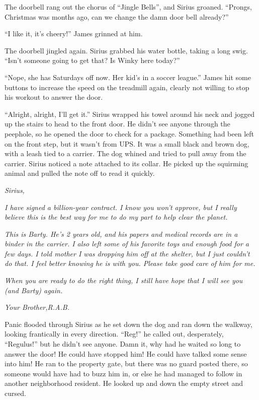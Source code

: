 \documentclass[12pt,twoside,openright]{memoir}
\begin{document}
The doorbell rang out the chorus of ``Jingle Bells'', and Sirius groaned. ``Prongs, Christmas was months ago, can we change the damn door bell already?''

``I like it, it's cheery!'' James grinned at him. 

The doorbell jingled again. Sirius grabbed his water bottle, taking a long swig. ``Isn't someone going to get that? Is Winky here today?''

``Nope, she has Saturdays off now. Her kid's in a soccer league.'' James hit some buttons to increase the speed on the treadmill again, clearly not willing to stop his workout to answer the door.

``Alright, alright, I'll get it.'' Sirius wrapped his towel around his neck and jogged up the stairs to head to the front door. He didn't see anyone through the peephole, so he opened the door to check for a package. Something had been left on the front step, but it wasn't from UPS. It was a small black and brown dog, with a leash tied to a carrier. The dog whined and tried to pull away from the carrier. Sirius noticed a note attached to its collar. He picked up the squirming animal and pulled the note off to read it quickly.

\textit{Sirius,} 

\textit{I have signed a billion-year contract. I know you won't approve, but I really believe this is the best way for me to do my part to help clear the planet. }

\textit{This is Barty. He's 2 years old, and his papers and medical records are in a binder in the carrier. I also left some of his favorite toys and enough food for a few days. I told mother I was dropping him off at the shelter, but I just couldn't do that. I feel better knowing he is with you. Please take good care of him for me. }

\textit{When you are ready to do the right thing, I still have hope that I will see you (and Barty) again.} 

\textit{Your Brother,\newline R.A.B.} 

Panic flooded through Sirius as he set down the dog and ran down the walkway, looking frantically in every direction.
``Reg!'' he called out, desperately, ``Regulus!'' but he didn't see anyone. Damn it, why had he waited so long to answer the door! He could have stopped him! He could have talked some sense into him! He ran to the property gate, but there was no guard posted there, so someone would have had to buzz him in, or else he had managed to follow in another neighborhood resident. He looked up and down the empty street and cursed. 
\end{document}
